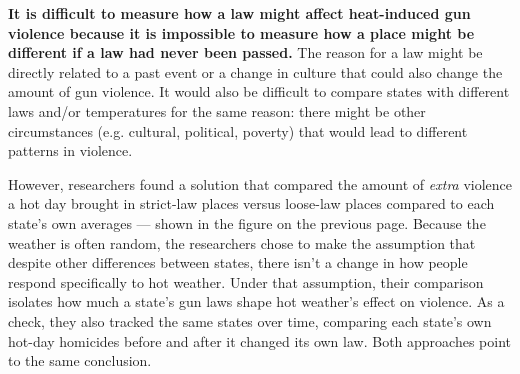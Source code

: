\documentclass[
  11pt,
]{article}
\begin{document}
%

\noindent \textbf{It is difficult to measure how a law might affect heat-induced gun violence because it is impossible to measure how a place might be different if a law had never been passed.} The reason for a law might be directly related to a past event or a change in culture that could also change the amount of gun violence. It would also be difficult to compare states with different laws and/or temperatures for the same reason: there might be other circumstances (e.g. cultural, political, poverty) that would lead to different patterns in violence.

\noindent However, researchers found a solution that compared the amount of \emph{extra} violence a hot day brought in strict-law places versus loose-law places compared to each state's own averages --- shown in the figure on the previous page. Because the weather is often random, the researchers chose to make the assumption that despite other differences between states, there isn't a change in how people respond specifically to hot weather. Under that assumption, their comparison isolates how much a state's gun laws shape hot weather's effect on violence. As a check, they also tracked the same states over time, comparing each state's own hot-day homicides before and after it changed its own law. Both approaches point to the same conclusion.
\end{document}
